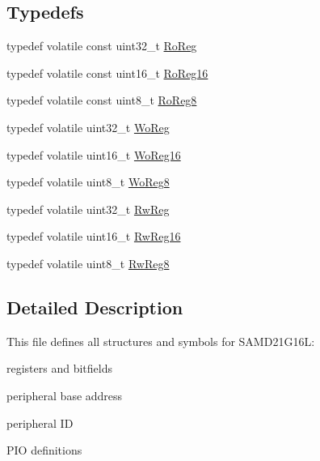 \subsection*{Typedefs}
\begin{DoxyCompactItemize}
\item 
typedef volatile const uint32\+\_\+t \mbox{\hyperlink{group___s_a_m_d21_g16_l__definitions_ga5d556f8391af4141be23f7334ac9dd68}{Ro\+Reg}}
\item 
typedef volatile const uint16\+\_\+t \mbox{\hyperlink{group___s_a_m_d21_g16_l__definitions_gaebf6e33c2d49a802e06e22a95ea9d0d0}{Ro\+Reg16}}
\item 
typedef volatile const uint8\+\_\+t \mbox{\hyperlink{group___s_a_m_d21_g16_l__definitions_ga0d957f1433aaf5d70e4dc2b68288442d}{Ro\+Reg8}}
\item 
typedef volatile uint32\+\_\+t \mbox{\hyperlink{group___s_a_m_d21_g16_l__definitions_gac0f96d4e8018367b38f527007cf0eafd}{Wo\+Reg}}
\item 
typedef volatile uint16\+\_\+t \mbox{\hyperlink{group___s_a_m_d21_g16_l__definitions_ga0ab0e5f6c8301aa1c2068e511d854094}{Wo\+Reg16}}
\item 
typedef volatile uint8\+\_\+t \mbox{\hyperlink{group___s_a_m_d21_g16_l__definitions_ga5e336e5a36ee12ebeafb021108e5275b}{Wo\+Reg8}}
\item 
typedef volatile uint32\+\_\+t \mbox{\hyperlink{group___s_a_m_d21_g16_l__definitions_gacf1496e3bbe303e55f627fc7558a68c7}{Rw\+Reg}}
\item 
typedef volatile uint16\+\_\+t \mbox{\hyperlink{group___s_a_m_d21_g16_l__definitions_gacce07556c80fc352ae607f225f19fed5}{Rw\+Reg16}}
\item 
typedef volatile uint8\+\_\+t \mbox{\hyperlink{group___s_a_m_d21_g16_l__definitions_gae361754be775bb192f85821d3ab33c17}{Rw\+Reg8}}
\end{DoxyCompactItemize}


\subsection{Detailed Description}
This file defines all structures and symbols for S\+A\+M\+D21\+G16L\+:
\begin{DoxyItemize}
\item registers and bitfields
\item peripheral base address
\item peripheral ID
\item P\+IO definitions 
\end{DoxyItemize}

